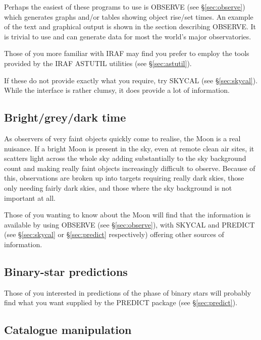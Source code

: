 \documentclass[twoside,11pt]{article}
\newcommand{\xref}[3]{#1}
\newcommand{\xlabel}[1]{}
\newcommand{\OBSERVEref}{\xref{OBSERVE}{sun146}{}}
\begin{document}
Perhaps the easiest of these programs to use is {\OBSERVEref}
(see \S{\ref{sec:observe}}) which generates graphs and/or tables showing object
rise/set times. An example of the text and graphical output is shown in
the section describing OBSERVE. It is trivial to use and
can generate data for most the world's major observatories.

Those of you more familiar with IRAF may find you prefer to employ the
tools provided by the IRAF ASTUTIL utilities (see \S{\ref{sec:astutil}}).

If these do not provide exactly what you require, try SKYCAL (see \S{\ref{sec:skycal}}). While the
interface is rather clumsy, it does provide a lot of information.

\subsection{Bright/grey/dark time} \xlabel{BRIGHT}
\label{sec:bright}

As observers of very faint objects quickly come to realise,
the Moon is a real nuisance. If a bright Moon is present in the sky,
even at remote clean air sites, it scatters light across the whole sky
adding substantially to the sky background count and making really
faint objects increasingly difficult to observe. Because of this,
observations are broken up into targets requiring really dark skies,
those only needing fairly dark skies, and those where the
sky background is not important at all.

Those of you wanting to know about the Moon will find that the information is
available by using {\OBSERVEref} (see \S{\ref{sec:observe}}), with SKYCAL and
PREDICT (see \S{\ref{sec:skycal}} or \S{\ref{sec:predict}} respectively) offering
other sources of information.

\subsection{Binary-star predictions} \xlabel{BINARY}
\label{sec:binary}

Those of you interested in predictions of the phase of binary stars
will probably find what you want supplied by  the PREDICT package (see \S{\ref{sec:predict}}).

\subsection{Catalogue manipulation} \xlabel{CATALOGUEM}
\label{sec:cataloguem}
\end{document}
